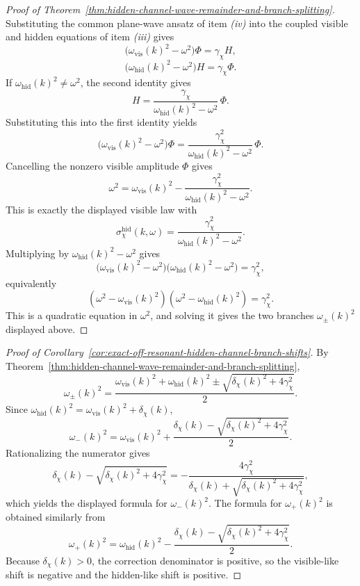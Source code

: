 \begin{proof}[Proof of Theorem~\ref{thm:hidden-channel-wave-remainder-and-branch-splitting}]
\label{proof:thm:hidden-channel-wave-remainder-and-branch-splitting}
Substituting the common plane-wave ansatz of item \emph{(iv)} into the coupled
visible and hidden equations of item \emph{(iii)} gives
\[
\bigl(\omega_{\mathrm{vis}}(k)^2-\omega^2\bigr)\Phi
=
\gamma_{\chi}H,
\]
\[
\bigl(\omega_{\mathrm{hid}}(k)^2-\omega^2\bigr)H
=
\gamma_{\chi}\Phi.
\]
If \(\omega_{\mathrm{hid}}(k)^2\neq \omega^2\), the second identity gives
\[
H
=
\frac{\gamma_{\chi}}{\omega_{\mathrm{hid}}(k)^2-\omega^2}\,\Phi.
\]
Substituting this into the first identity yields
\[
\bigl(\omega_{\mathrm{vis}}(k)^2-\omega^2\bigr)\Phi
=
\frac{\gamma_{\chi}^2}{\omega_{\mathrm{hid}}(k)^2-\omega^2}\,\Phi.
\]
Cancelling the nonzero visible amplitude \(\Phi\) gives
\[
\omega^2
=
\omega_{\mathrm{vis}}(k)^2
-
\frac{\gamma_{\chi}^2}{\omega_{\mathrm{hid}}(k)^2-\omega^2}.
\]
This is exactly the displayed visible law with
\[
\sigma_{\chi}^{\mathrm{hid}}(k,\omega)
=
\frac{\gamma_{\chi}^2}{\omega_{\mathrm{hid}}(k)^2-\omega^2}.
\]
Multiplying by \(\omega_{\mathrm{hid}}(k)^2-\omega^2\) gives
\[
\bigl(\omega_{\mathrm{vis}}(k)^2-\omega^2\bigr)
\bigl(\omega_{\mathrm{hid}}(k)^2-\omega^2\bigr)
=
\gamma_{\chi}^2,
\]
equivalently
\[
(\omega^2-\omega_{\mathrm{vis}}(k)^2)
(\omega^2-\omega_{\mathrm{hid}}(k)^2)
=
\gamma_{\chi}^2.
\]
This is a quadratic equation in \(\omega^2\), and solving it gives the two
branches \(\omega_{\pm}(k)^2\) displayed above.
\end{proof}

\begin{proof}[Proof of Corollary~\ref{cor:exact-off-resonant-hidden-channel-branch-shifts}]
\label{proof:cor:exact-off-resonant-hidden-channel-branch-shifts}
By Theorem~\ref{thm:hidden-channel-wave-remainder-and-branch-splitting},
\[
\omega_{\pm}(k)^2
=
\frac{
\omega_{\mathrm{vis}}(k)^2+\omega_{\mathrm{hid}}(k)^2
\pm
\sqrt{
\delta_{\chi}(k)^2+4\gamma_{\chi}^2
}
}{2}.
\]
Since \(\omega_{\mathrm{hid}}(k)^2=\omega_{\mathrm{vis}}(k)^2+\delta_{\chi}(k)\),
\[
\omega_-(k)^2
=
\omega_{\mathrm{vis}}(k)^2
+
\frac{\delta_{\chi}(k)-\sqrt{\delta_{\chi}(k)^2+4\gamma_{\chi}^2}}{2}.
\]
Rationalizing the numerator gives
\[
\delta_{\chi}(k)-\sqrt{\delta_{\chi}(k)^2+4\gamma_{\chi}^2}
=
-\frac{4\gamma_{\chi}^2}{
\delta_{\chi}(k)+\sqrt{\delta_{\chi}(k)^2+4\gamma_{\chi}^2}
},
\]
which yields the displayed formula for \(\omega_-(k)^2\). The formula for
\(\omega_+(k)^2\) is obtained similarly from
\[
\omega_+(k)^2
=
\omega_{\mathrm{hid}}(k)^2
-
\frac{\delta_{\chi}(k)-\sqrt{\delta_{\chi}(k)^2+4\gamma_{\chi}^2}}{2}.
\]
Because \(\delta_{\chi}(k)>0\), the correction denominator is positive, so the
visible-like shift is negative and the hidden-like shift is positive.
\end{proof}

